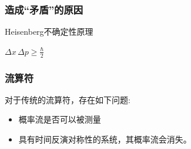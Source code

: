\documentclass[UTF8]{beamer}
\begin{document}
\begin{frame}\frametitle{造成“矛盾”的原因}
    \begin{block}{Heisenberg不确定性原理}
        \Large
        \begin{center}
            $\Delta x \, \Delta p \geqslant \frac{\hbar}{2}$
        \end{center}
    \end{block}
\end{frame}
%
\begin{frame}\frametitle{流算符}
    对于传统的流算符，存在如下问题:
    \begin{itemize}
        \item 概率流是否可以被测量
        \item 具有时间反演对称性的系统，其概率流会消失。
    \end{itemize}
\end{frame}
\end{document}
